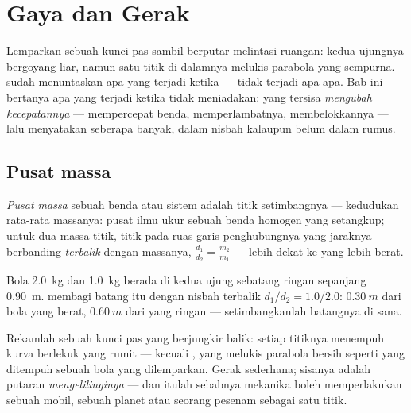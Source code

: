 \chapter{Gaya dan Gerak}\label{ch:g11:forces-and-motion}

Lemparkan sebuah kunci pas sambil berputar melintasi ruangan: kedua
ujungnya bergoyang liar, namun satu titik di dalamnya melukis parabola
yang sempurna.  sudah menuntaskan apa yang terjadi
ketika  --- tidak terjadi apa-apa. Bab ini
bertanya apa yang terjadi ketika  tidak meniadakan:  yang
tersisa \emph{mengubah kecepatannya} --- mempercepat benda,
memperlambatnya, membelokkannya --- lalu menyatakan seberapa banyak,
dalam nisbah kalaupun belum dalam rumus.

\section{Pusat massa}

\begin{definition}\label{def:g11:forces-and-motion:com}
\emph{Pusat massa} sebuah benda atau sistem adalah
titik setimbangnya --- kedudukan rata-rata massanya: pusat ilmu ukur
sebuah benda homogen yang setangkup; untuk dua massa titik, titik pada
ruas garis penghubungnya yang jaraknya berbanding \emph{terbalik}
dengan massanya, $\frac{d_1}{d_2} = \frac{m_2}{m_1}$ --- lebih dekat ke
yang lebih berat.
\end{definition}

\begin{example}\label{ex:g11:forces-and-motion:dumbbell}
Bola \qty{2.0}{kg} dan \qty{1.0}{kg} berada di kedua ujung sebatang
ringan sepanjang \qty{0.90}{m}.  membagi batang itu
dengan nisbah terbalik $d_1/d_2 = 1.0/2.0$: $\qty{0.30}{m}$ dari bola
yang berat, $\qty{0.60}{m}$ dari yang ringan --- setimbangkanlah
batangnya di sana.
\end{example}

\begin{remark}\label{rem:g11:forces-and-motion:wrench}
Rekamlah sebuah kunci pas yang berjungkir balik: setiap titiknya
menempuh kurva berlekuk yang rumit --- kecuali , yang
melukis parabola bersih seperti yang ditempuh sebuah bola yang
dilemparkan. Gerak  sederhana; sisanya adalah putaran
\emph{mengelilinginya} --- dan itulah sebabnya mekanika boleh
memperlakukan sebuah mobil, sebuah planet atau seorang pesenam sebagai
satu titik.
\end{remark}

